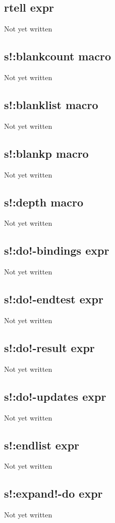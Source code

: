 \documentclass[a4paper,11pt]{article}
\begin{document}
{\subsection{\ttfamily rtell expr}
Not yet written

\subsection{\ttfamily s!:blankcount macro}
Not yet written

\subsection{\ttfamily s!:blanklist macro}
Not yet written

\subsection{\ttfamily s!:blankp macro}
Not yet written

\subsection{\ttfamily s!:depth macro}
Not yet written

\subsection{\ttfamily s!:do!-bindings expr}
Not yet written

\subsection{\ttfamily s!:do!-endtest expr}
Not yet written

\subsection{\ttfamily s!:do!-result expr}
Not yet written

\subsection{\ttfamily s!:do!-updates expr}
Not yet written

\subsection{\ttfamily s!:endlist expr}
Not yet written

\subsection{\ttfamily s!:expand!-do expr}
Not yet written

}
\end{document}
